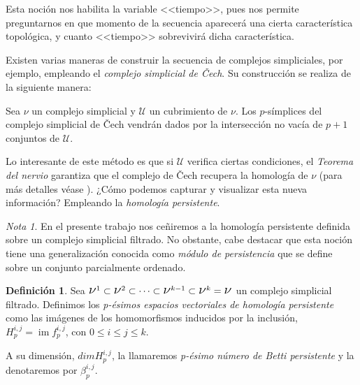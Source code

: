 \documentclass[12pt, a4paper, twoside]{book}
\numberwithin{equation}{section}
\theoremstyle{definition}
\newtheorem{defi}{Definición}[section]
\theoremstyle{remark}
\newtheorem*{remark}{Nota}
\theoremstyle{plain}
\DeclareMathOperator{\Ima}{im}
\begin{document}
	Esta noción nos habilita la variable <<tiempo>>, pues nos permite 
	preguntarnos en que momento de la secuencia aparecerá una cierta 
	característica topológica, y cuanto <<tiempo>> sobrevivirá dicha 
	característica.

	Existen varias maneras de construir la secuencia de complejos 
	simpliciales, por ejemplo, empleando el \emph{complejo simplicial de 
	Čech}. Su construcción se realiza de la siguiente manera:

	Sea {\Large $\nu$} un complejo simplicial y $\mathcal{U}$ un 
	cubrimiento de {\Large $\nu$}. Los $p$-símplices del complejo simplicial
	de Čech vendrán dados por la intersección no vacía de $p+1$ conjuntos de
	$\mathcal{U}$.

	Lo interesante de este método es que si $\mathcal{U}$ verifica ciertas
	condiciones, el \emph{Teorema del nervio} garantiza que el complejo de
	Čech recupera la homología de {\Large $\nu$} (para más detalles véase 
	\cite{TeoremaNervio-Ghrist}). ¿Cómo podemos capturar y visualizar esta 
	nueva información? Empleando la \emph{homología persistente}.

	\begin{remark}
	En el presente trabajo nos ceñiremos a la homología persistente 
	definida sobre un complejo simplicial filtrado. No obstante, cabe 
	destacar que esta noción tiene una generalización conocida como 
	\emph{módulo de persistencia} que se define sobre un conjunto 
	parcialmente ordenado.
	\end{remark}

	\begin{defi}
	Sea $ \text{{\Large $\nu$}$^{1}$} 
		\subset \text{{\Large $\nu$}$^{2}$} \subset \cdots \subset
		\text{{\Large $\nu$}$^{k-1}$} \subset 
		\text{{\Large $\nu$}$^{k}$} = \text{{\Large $\nu$}}$ un 
		complejo simplicial filtrado. Definimos los \textit{p-ésimos
		espacios vectoriales de homología persistente} como las 
		imágenes de los homomorfismos inducidos por la inclusión, 
		$H_{p}^{i,j}=\Ima f_{p}^{i,j}$, con $0\leq i \leq j \leq k$.

		A su dimensión, $dimH_{p}^{i,j}$, la llamaremos \textit{p-ésimo 
		número de Betti persistente} y la denotaremos por 
		$\beta_{p}^{i,j}$.
	\end{defi}
\end{document}
